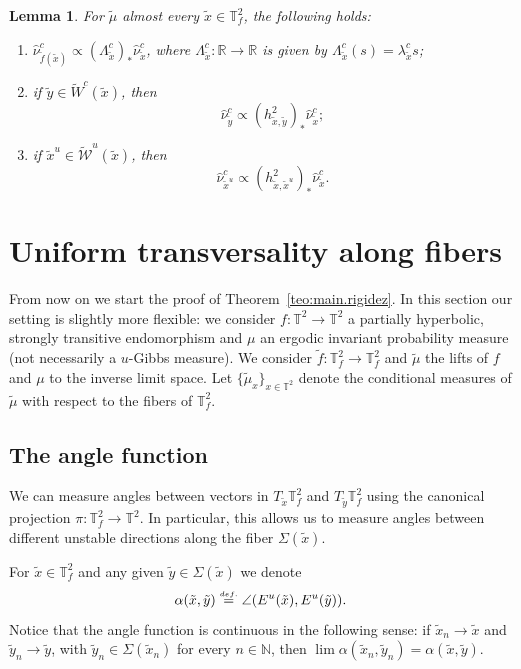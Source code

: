 \documentclass[a4paper,11pt,reqno]{amsart}
\def\tW{\widetilde W}
\newcommand{\R}{{\mathbb R}}
\newcommand{\N}{{\mathbb N}}
\newcommand{\TT}{{\mathbb{T}^2}}
\newcommand{\TTf}{{\mathbb{T}_f^2}}
\newcommand{\cW}{{\mathcal W}}
\newcommand{\eqdef}{\stackrel{\scriptscriptstyle\textrm def.}{=}}
\newcommand{\tix}{\tilde{x}}
\newcommand{\tif}{\tilde{f}}
\newcommand{\tm}{\tilde{\mu}}
\newcommand{\w}{\widetilde{\cW}}
\newtheorem{lemma}[theorem]{Lemma}
\theoremstyle{definition}
\begin{document}
\begin{lemma}
	\label{lem:basicmoves}
For $\tilde{\mu}$ almost every $\tix \in \TTf$, the following holds:
\begin{enumerate}
	\item $\hat{\nu}^c_{\tilde{f}(\tix)} \propto (\Lambda^c_{\tix})_*\hat{\nu}^c_{\tix}$, where $\Lambda^c_{\tix}: \R \to \R$ is given by $\Lambda^c_{\tix}(s) = \lambda^c_{\tix}s$;
	\item if $\tilde{y} \in \tW^c(\tix)$, then 
	\[
	\hat{\nu}^c_{\tilde{y}} \propto (h^2_{\tilde{x}, \tilde{y}})_*\hat{\nu}^c_{\tix};
	\]
	\item  if $\tilde{x}^u\in\w^u(\tix)$, then 
	\[
	\hat{\nu}^c_{\tilde{x}^u} \propto (h^2_{\tilde{x}, \tilde{x}^u})_*\hat{\nu}^c_{\tix}.
	\]
\end{enumerate} 
\end{lemma}

\section{Uniform transversality along fibers}
\label{sec:transv}

From now on we start the proof of Theorem~\ref{teo:main.rigidez}. In this section our setting is slightly more flexible: we consider $f:\TT\to\TT$ a partially hyperbolic, {strongly transitive} endomorphism and $\mu$ an ergodic invariant probability measure (not necessarily a $u$-Gibbs measure). We consider $\tif:\TTf\to\TTf$ and $\tm$ the lifts of $f$ and $\mu$ to the inverse limit space. Let $\{\tm_x\}_{x\in\TT}$ denote the conditional measures of $\tm$ with respect to the fibers of $\TTf$. 

\subsection{The angle function}
\label{sec:transv-bad}

We can measure angles between vectors in $T_{\tix}\TTf$ and $T_{\tilde{y}}\TTf$ using the canonical projection $\pi:\TTf\to\TT$. In particular, this allows us to measure angles between different unstable directions along the fiber $\Sigma(\tix)$. 

For $\tix\in\TTf$ and any given $\tilde{y}\in\Sigma(\tix)$ we denote
\[
\alpha(\tix,\tilde{y})\eqdef\angle(E^u(\tix),E^u(\tilde{y})).
\]
Notice that the angle function is continuous in the following sense: if $\tilde{x}_n\to\tix$ and $\tilde{y}_n\to\tilde{y}$, with $\tilde{y}_n\in\Sigma(\tix_n)$ for every $n\in\N$, then $\lim\alpha(\tix_n,\tilde{y}_n)=\alpha(\tix,\tilde{y})$.
\end{document}
